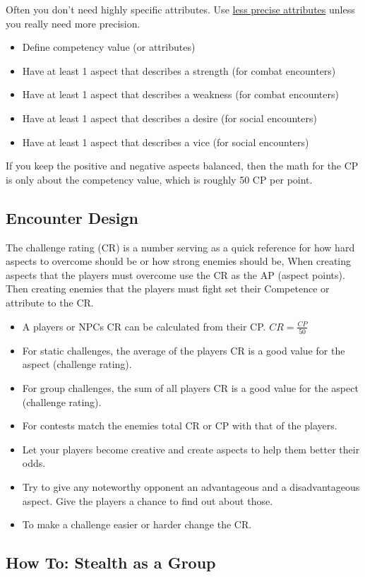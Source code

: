 \documentclass[11pt]{article}
\begin{document}
{Often you don't need highly specific attributes. Use \hyperref[sec:orgb44716c]{less precise attributes} unless you really need more precision.
\begin{itemize}
\item Define competency value (or attributes)
\item Have at least 1 aspect that describes a strength (for combat encounters)
\item Have at least 1 aspect that describes a weakness (for combat encounters)
\item Have at least 1 aspect that describes a desire (for social encounters)
\item Have at least 1 aspect that describes a vice (for social encounters)
\end{itemize}
If you keep the positive and negative aspects balanced, then the math for the CP is only about the competency value, which is roughly 50 CP per point.
\subsection{Encounter Design}
\label{sec:org12a221b}

The challenge rating (CR) is a number serving as a quick reference for how hard aspects to overcome should be or how strong enemies should be, When creating aspects that the players must overcome use the CR as the AP (aspect points). Then creating enemies that the players must fight set their Competence or attribute to the CR.
\begin{itemize}
\item A players or NPCs CR can be calculated from their CP. \(CR = \frac{CP}{50}\)
\item For static challenges, the average of the players CR is a good value for the aspect (challenge rating).
\item For group challenges, the sum of all players CR is a good value for the aspect (challenge rating).
\item For contests match the enemies total CR or CP with that of the players.
\item Let your players become creative and create aspects to help them better their odds.
\item Try to give any noteworthy opponent an advantageous and a disadvantageous aspect. Give the players a chance to find out about those.
\item To make a challenge easier or harder change the CR.
\end{itemize}
\subsection{How To: Stealth as a Group}
\label{sec:org451ffcd}

}
\end{document}
